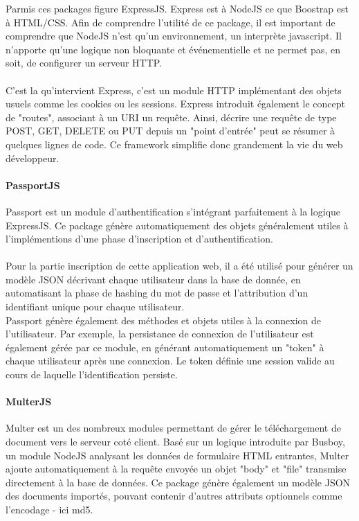 \documentclass[oneside,a4paper,13pt]{article}
\begin{document}
Parmis ces packages figure ExpressJS. Express est à NodeJS ce que Boostrap est à HTML/CSS. Afin de comprendre l'utilité de ce package, il est important de comprendre que NodeJS n'est qu'un environnement, un interprète javascript. Il  n'apporte qu'une logique non bloquante et événementielle et ne permet pas, en soit, de configurer un serveur HTTP. \\ \\
C'est la qu'intervient Express, c'est un  module HTTP implémentant des objets usuels comme les cookies ou les sessions. Express introduit également le concept de "routes", associant à un URI un requête. Ainsi, décrire une requête de type POST, GET, DELETE ou PUT depuis un "point d'entrée" peut se résumer à quelques lignes de code. Ce framework simplifie donc grandement la vie du web développeur.  

\paragraph{PassportJS}

Passport est un module d'authentification s'intégrant parfaitement à la logique ExpressJS. Ce package génère automatiquement des objets généralement utiles à l'implémentions d'une phase d'inscription et d'authentification. \\ \\
Pour la partie inscription de cette application web, il a été utilisé pour générer un modèle JSON décrivant chaque utilisateur dans la base de donnée, en automatisant la phase de hashing du mot de passe et l'attribution d'un identifiant unique pour chaque utilisateur. \\
Passport génère également des méthodes et objets utiles à la connexion de l'utilisateur. Par exemple, la persistance de connexion de l'utilisateur est également gérée par ce module, en générant automatiquement un "token" à chaque utilisateur après une connexion. Le token définie une session valide au cours de laquelle l'identification persiste.

\paragraph{MulterJS}

Multer est un des nombreux modules permettant de gérer le téléchargement de document vers le serveur coté client. Basé sur un logique introduite par Busboy, un module NodeJS analysant les données de formulaire HTML entrantes, Multer ajoute automatiquement à la requête envoyée un objet "body" et "file" transmise directement à la base de données. Ce package génère également un modèle JSON des documents importés, pouvant contenir d'autres attributs optionnels comme l'encodage - ici md5.
\end{document}
